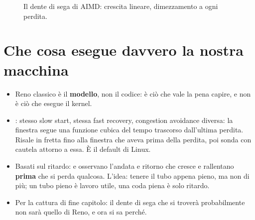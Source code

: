 \begin{figure}[H]
\centering
{}
\caption{Il dente di sega di AIMD: crescita lineare, dimezzamento a ogni perdita.}
\end{figure}

\section{Che cosa esegue davvero la nostra macchina}

\begin{itemize}
    \item Reno classico è il \textbf{modello}, non il codice: è ciò che vale la pena capire, e non è ciò che esegue il
          kernel.
    \item {}: stesso slow start, stessa fast recovery, congestion avoidance diversa: la finestra segue una funzione
          cubica del tempo trascorso dall'ultima perdita. Risale in fretta fino alla finestra che aveva prima della perdita,
          poi sonda con cautela attorno a essa. È il default di Linux.
    \item Basati sul ritardo:  e  osservano l'andata e ritorno che cresce e rallentano \textbf{prima}
          che si perda qualcosa. L'idea: tenere il tubo appena pieno, ma non di più; un tubo pieno è lavoro utile, una coda
          piena è solo ritardo.
    \item Per la cattura di fine capitolo: il dente di sega che si troverà probabilmente non sarà quello di Reno, e ora si sa
          perché.
\end{itemize}

